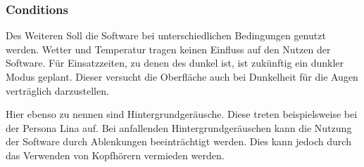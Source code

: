 \subsubsection{Conditions}

Des Weiteren Soll die Software bei unterschiedlichen Bedingungen genutzt werden.
Wetter und Temperatur tragen keinen Einfluss auf den Nutzen der Software.
Für Einsatzzeiten, zu denen des dunkel ist, ist zukünftig ein dunkler Modus geplant.
Dieser versucht die Oberfläche auch bei Dunkelheit für die Augen verträglich darzustellen.

Hier ebenso zu nennen sind Hintergrundgeräusche.
Diese treten beispielsweise bei der Persona Lina auf.
Bei anfallenden Hintergrundgeräuschen kann die Nutzung der Software durch Ablenkungen beeinträchtigt werden.
Dies kann jedoch durch das Verwenden von Kopfhörern vermieden werden.